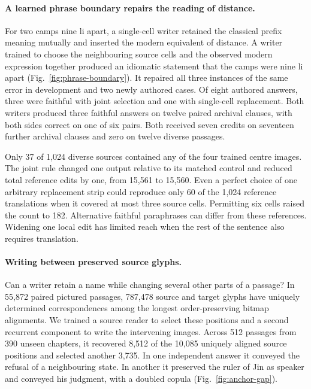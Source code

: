 \documentclass[12pt,a4paper]{article}
\providecommand{\DIFadd}[1]{{\protect\color{blue} \sf #1}} %
\begin{document}
\paragraph{\DIFadd{A learned phrase boundary repairs the reading of distance.}}
\DIFadd{For two camps nine li apart, a single-cell writer retained the classical prefix meaning mutually and inserted the modern equivalent of distance. A writer trained to choose the neighbouring source cells and the observed modern expression together produced an idiomatic statement that the camps were nine li apart (Fig.~\ref{fig:phrase-boundary}). It repaired all three instances of the same error in development and two newly authored cases. Of eight authored answers, three were faithful with joint selection and one with single-cell replacement. Both writers produced three faithful answers on twelve paired archival clauses, with both sides correct on one of six pairs. Both received seven credits on seventeen further archival clauses and zero on twelve diverse passages.
}

\DIFadd{Only 37 of 1,024 diverse sources contained any of the four trained centre images. The joint rule changed one output relative to its matched control and reduced total reference edits by one, from 15,561 to 15,560. Even a perfect choice of one arbitrary replacement strip could reproduce only 60 of the 1,024 reference translations when it covered at most three source cells. Permitting six cells raised the count to 182. Alternative faithful paraphrases can differ from these references. Widening one local edit has limited reach when the rest of the sentence also requires translation.
}

\paragraph{\DIFadd{Writing between preserved source glyphs.}}
\DIFadd{Can a writer retain a name while changing several other parts of a passage? In 55,872 paired pictured passages, 787,478 source and target glyphs have uniquely determined correspondences among the longest order-preserving bitmap alignments. We trained a source reader to select these positions and a second recurrent component to write the intervening images. Across 512 passages from 390 unseen chapters, it recovered 8,512 of the 10,085 uniquely aligned source positions and selected another 3,735. In one independent answer it conveyed the refusal of a neighbouring state. In another it preserved the ruler of Jin as speaker and conveyed his judgment, with a doubled copula (Fig.~\ref{fig:anchor-gap}).
}
\end{document}

